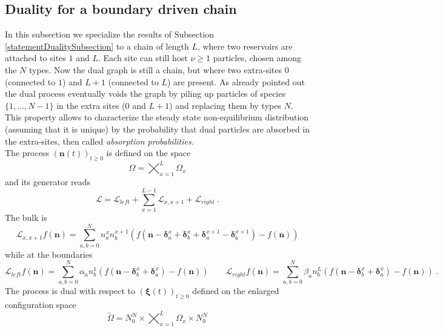 \documentclass[10pt]{article}
\numberwithin{equation}{section}
\numberwithin{equation}{subsection}
\newcommand{\dt}{\;.}
\begin{document}
\subsection{Duality for a boundary driven chain}\label{Subsection-ss-nonI}
In this subsection we specialize the results of Subsection \ref{statementDualitySubsection} to a chain of length $L$, where two reservoirs are attached to sites $1$ and $L$. Each site can still host $\nu\geq 1$ particles, chosen among the $N$ types. Now the dual graph is still a chain, but where two extra-sites $0$ (connected to $1$) and $L+1$ (connected to $L$) are present. As already pointed out the dual process eventually voids the graph by piling up particles of species $\{1,\ldots,N-1\}$ in the extra sites ($0$ and $L+1$) and replacing them by types $N$. This property allows to characterize the steady state non-equilibrium distribution (assuming that it is unique) by the probability that dual particles are absorbed in the extra-sites, then called \textit{absorption probabilities}. \\The process $\left(\bm{n}(t)\right)_{t\geq0}$ is defined on the space
 \begin{equation}\label{stateSpace-Chain}
 	\Omega=\bigtimes_{x=1}^{L} \Omega_{x}
 \end{equation} and its generator reads
\begin{equation}
	\mathcal{L}=\mathcal{L}_{left}+\sum_{x=1}^{L-1}\mathcal{L}_{x,x+1}+\mathcal{L}_{right}\dt
\end{equation} 
The bulk is 
\begin{equation}
	\mathcal{L}_{x,x+1}f(\bm{n})=\sum_{a,b=0}^{N}n_{a}^{x}n_{b}^{x+1}\left(f(\bm{n}-\bm{\delta}_{a}^{x}+\bm{\delta}_{b}^{x}+\bm{\delta}_{a}^{x+1}-\bm{\delta}_{b}^{x+1})-f(\bm{n})\right)
\end{equation}
while at the boundaries 
\begin{equation}
	\mathcal{L}_{left}f(\bm{n})=\sum_{a,b=0}^{N}\alpha_{a}n_{b}^{1}\left(f(\bm{n}-\bm{\delta}_{b}^{x}+\bm{\delta}_{a}^{x})-f(\bm{n})\right)\qquad \mathcal{L}_{right}f(\bm{n})=\sum_{a,b=0}^{N}\beta_{a}n_{b}^{L}\left(f(\bm{n}-\bm{\delta}_{b}^{x}+\bm{\delta}_{a}^{x})-f(\bm{n})\right)\dt
\end{equation}
 The process is dual with respect to $(\bm{\xi}(t))_{t\geq0} $ defined on the enlarged configuration space
\begin{equation}\label{stateSpaceDUAL-Chain}	
	\widetilde{\Omega}=N_{0}^{N}\times\bigtimes_{x=1}^{L} \Omega_{x}\times N_{0}^{N}
\end{equation}
\end{document}
